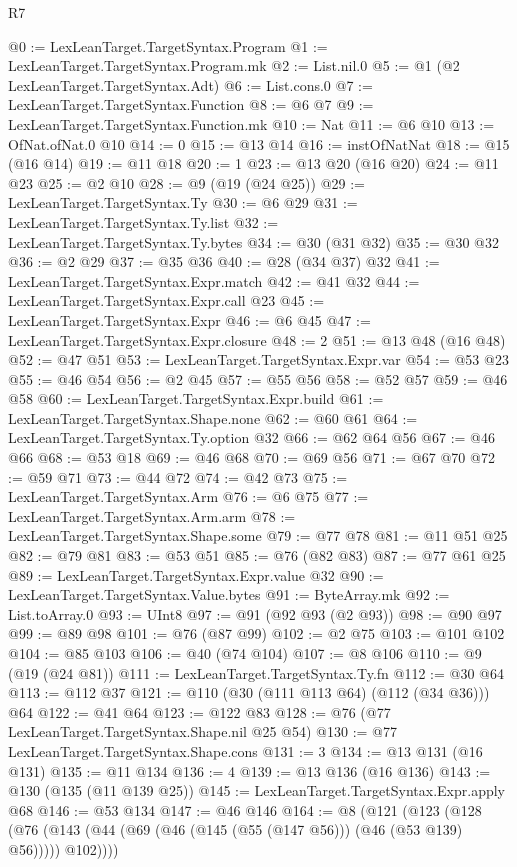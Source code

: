 \begin{lexlean}{R7}
\begin{coremodule}
@0 := LexLeanTarget.TargetSyntax.Program
@1 := LexLeanTarget.TargetSyntax.Program.mk
@2 := List.nil.{0}
@5 := @1 (@2 LexLeanTarget.TargetSyntax.Adt)
@6 := List.cons.{0}
@7 := LexLeanTarget.TargetSyntax.Function
@8 := @6 @7
@9 := LexLeanTarget.TargetSyntax.Function.mk
@10 := Nat
@11 := @6 @10
@13 := OfNat.ofNat.{0} @10
@14 := 0
@15 := @13 @14
@16 := instOfNatNat
@18 := @15 (@16 @14)
@19 := @11 @18
@20 := 1
@23 := @13 @20 (@16 @20)
@24 := @11 @23
@25 := @2 @10
@28 := @9 (@19 (@24 @25))
@29 := LexLeanTarget.TargetSyntax.Ty
@30 := @6 @29
@31 := LexLeanTarget.TargetSyntax.Ty.list
@32 := LexLeanTarget.TargetSyntax.Ty.bytes
@34 := @30 (@31 @32)
@35 := @30 @32
@36 := @2 @29
@37 := @35 @36
@40 := @28 (@34 @37) @32
@41 := LexLeanTarget.TargetSyntax.Expr.match
@42 := @41 @32
@44 := LexLeanTarget.TargetSyntax.Expr.call @23
@45 := LexLeanTarget.TargetSyntax.Expr
@46 := @6 @45
@47 := LexLeanTarget.TargetSyntax.Expr.closure
@48 := 2
@51 := @13 @48 (@16 @48)
@52 := @47 @51
@53 := LexLeanTarget.TargetSyntax.Expr.var
@54 := @53 @23
@55 := @46 @54
@56 := @2 @45
@57 := @55 @56
@58 := @52 @57
@59 := @46 @58
@60 := LexLeanTarget.TargetSyntax.Expr.build
@61 := LexLeanTarget.TargetSyntax.Shape.none
@62 := @60 @61
@64 := LexLeanTarget.TargetSyntax.Ty.option @32
@66 := @62 @64 @56
@67 := @46 @66
@68 := @53 @18
@69 := @46 @68
@70 := @69 @56
@71 := @67 @70
@72 := @59 @71
@73 := @44 @72
@74 := @42 @73
@75 := LexLeanTarget.TargetSyntax.Arm
@76 := @6 @75
@77 := LexLeanTarget.TargetSyntax.Arm.arm
@78 := LexLeanTarget.TargetSyntax.Shape.some
@79 := @77 @78
@81 := @11 @51 @25
@82 := @79 @81
@83 := @53 @51
@85 := @76 (@82 @83)
@87 := @77 @61 @25
@89 := LexLeanTarget.TargetSyntax.Expr.value @32
@90 := LexLeanTarget.TargetSyntax.Value.bytes
@91 := ByteArray.mk
@92 := List.toArray.{0}
@93 := UInt8
@97 := @91 (@92 @93 (@2 @93))
@98 := @90 @97
@99 := @89 @98
@101 := @76 (@87 @99)
@102 := @2 @75
@103 := @101 @102
@104 := @85 @103
@106 := @40 (@74 @104)
@107 := @8 @106
@110 := @9 (@19 (@24 @81))
@111 := LexLeanTarget.TargetSyntax.Ty.fn
@112 := @30 @64
@113 := @112 @37
@121 := @110 (@30 (@111 @113 @64) (@112 (@34 @36))) @64
@122 := @41 @64
@123 := @122 @83
@128 := @76 (@77 LexLeanTarget.TargetSyntax.Shape.nil @25 @54)
@130 := @77 LexLeanTarget.TargetSyntax.Shape.cons
@131 := 3
@134 := @13 @131 (@16 @131)
@135 := @11 @134
@136 := 4
@139 := @13 @136 (@16 @136)
@143 := @130 (@135 (@11 @139 @25))
@145 := LexLeanTarget.TargetSyntax.Expr.apply @68
@146 := @53 @134
@147 := @46 @146
@164 := @8
    (@121
      (@123
        (@128 (@76 (@143 (@44 (@69 (@46 (@145 (@55 (@147 @56))) (@46 (@53 @139) @56))))) @102))))

\end{coremodule}
\end{lexlean}
